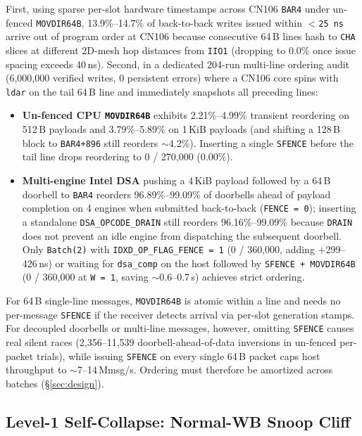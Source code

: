 First, using sparse per-slot hardware timestamps across CN106 \texttt{BAR4} under un-fenced \texttt{MOVDIR64B}, 13.9\%--14.7\% of back-to-back writes issued within \texttt{$<$25\,ns} arrive out of program order at CN106 because consecutive 64\,B lines hash to \texttt{CHA} slices at different 2D-mesh hop distances from \texttt{IIO1} (dropping to 0.0\% once issue spacing exceeds 40\,ns). Second, in a dedicated 204-run multi-line ordering audit (6,000,000 verified writes, 0 persistent errors) where a CN106 core spins with \texttt{ldar} on the tail 64\,B line and immediately snapshots all preceding lines:
\begin{itemize}
  \item \textbf{Un-fenced CPU \texttt{MOVDIR64B}} exhibits 2.21\%--4.99\% transient reordering on 512\,B payloads and 3.79\%--5.89\% on 1\,KiB payloads (and shifting a 128\,B block to \texttt{BAR4+896} still reorders $\sim$4.2\%). Inserting a single \texttt{SFENCE} before the tail line drops reordering to 0 / 270,000 (0.00\%).
  \item \textbf{Multi-engine Intel DSA} pushing a 4\,KiB payload followed by a 64\,B doorbell to \texttt{BAR4} reorders 96.89\%--99.09\% of doorbells ahead of payload completion on 4 engines when submitted back-to-back (\texttt{FENCE\,=\,0}); inserting a standalone \texttt{DSA\_OPCODE\_DRAIN} still reorders 96.16\%--99.09\% because \texttt{DRAIN} does not prevent an idle engine from dispatching the subsequent doorbell. Only \texttt{Batch(2)} with \texttt{IDXD\_OP\_FLAG\_FENCE\,=\,1} (0 / 360,000, adding +299--426\,ns) or waiting for \texttt{dsa\_comp} on the host followed by \texttt{SFENCE + MOVDIR64B} (0 / 360,000 at \texttt{W\,=\,1}, saving $\sim$0.6--0.7\,\textmu s) achieves strict ordering.
\end{itemize}
For 64\,B single-line messages, \texttt{MOVDIR64B} is atomic within a line and needs no per-message \texttt{SFENCE} if the receiver detects arrival via per-slot generation stamps. For decoupled doorbells or multi-line messages, however, omitting \texttt{SFENCE} causes real silent races (2,356--11,539 doorbell-ahead-of-data inversions in un-fenced per-packet trials), while issuing \texttt{SFENCE} on every single 64\,B packet caps host throughput to $\sim$7--14\,Mmsg/s. Ordering must therefore be amortized across batches (\S\ref{sec:design}).

\subsection{Level-1 Self-Collapse: Normal-WB Snoop Cliff}
\label{sec:dev_wb}

